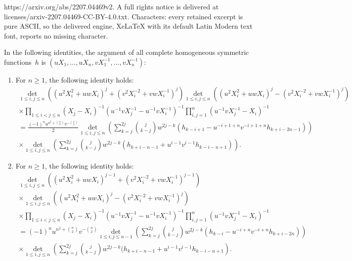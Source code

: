 \documentclass[10pt,a4paper]{amsart}
\begin{document}
https://arxiv.org/abs/2207.04469v2. A full rights notice is delivered at licenses/arxiv-2207.04469-CC-BY-4.0.txt. Characters: every retained excerpt is pure ASCII, so the delivered engine, XeLaTeX with its default Latin Modern text font, reports no missing character.
\begin{lemma} 
	\label{jacobitrudi3lem}
	In the following identities, the argument of all complete homogeneous symmetric functions~$h$ is $(u X_1,\ldots,u X_n,v X_1^{-1},\ldots,v X_n^{-1})$:
	\begin{enumerate}
		\item\label{lem:jacobitrudi3lem1} For $n \ge 1$, the following identity holds: 
		\begin{multline*} 
				\det\limits_{1 \le i,j \le n} \left( \left(u^2 X_i^2 + u w X_i\right)^j + \left(v^2 X_i^{-2} + v w X_i^{-1}\right)^j \right)
				\det\limits_{1 \le i,j \le n} \left( \left(u^2 X_i^2 + u w X_i\right)^j - \left(v^2 X_i^{-2} + v w X_i^{-1}\right)^j \right)\\
			\times \prod_{1 \le i < j \le n} (X_j-X_i)^{-1} (u^{-1} v X_j^{-1}-u^{-1}v X_i^{-1})^{-1} 
				\prod_{i,j=1}^{n}  (u^{-1} v X_j^{-1}-X_i)^{-1} \\
			= \frac{(-1)^n u^{n^2+\binom{n}{2}} v^{-\binom{n}{2}}}{2} 
			\det_{1 \le i, j \le n } \left( \sum_{k=j}^{2j} \binom{j}{k-j} w^{2j-k}  \left( h_{k-i+1} - u^{-i+1+n} v^{-i+1+n} h_{k+i-2n-1} \right) \right) 
			\\
			\times \det_{1 \le i,j \le n} \left(  \sum_{k=j}^{2j} \binom{j}{k-j} w^{2j-k} 
			(h_{k+i-n-1} + u^{i-1} v^{i-1} h_{k-i-n+1} )  \right).
		\end{multline*} 
		\item\label{lem:jacobitrudi3lem2} For $n \ge 1$, the following identity holds:
		\begin{multline*}
			\det\limits_{1 \le i,j \le n} \left( \left(u^2 X_i^2 + u w X_i\right)^{j-1} + \left(v^2 X_i^{-2} + v w X_i^{-1}\right)^{j-1} \right) \\
			\times\det\limits_{1 \le i,j \le n} \left( \left(u^2 X_i^2 + u w X_i\right)^j - \left(v^2 X_i^{-2} + v w X_i^{-1}\right)^j \right) \\
			\times\prod_{1 \le i < j \le n} (X_j-X_i)^{-1} (u^{-1} v X_j^{-1}-u^{-1}v X_i^{-1})^{-1} 
			\prod_{i,j=1}^{n}  (u^{-1} v X_j^{-1}-X_i)^{-1}\\
			= (-1)^n u^{n^2+\binom{n}{2}} v^{-\binom{n}{2}} 
			\det_{1 \le i, j \le n-1 } \left( \sum_{k=j}^{2j} \binom{j}{k-j} w^{2j-k}  \left( h_{k-i} - u^{-i+n} v^{-i+n} 
			h_{k+i-2n} \right) \right) 
			\\
			\times 
			\det_{1 \le i,j \le n} \left(  \sum_{k=j}^{2j} \binom{j}{k-j} w^{2j-k} 
			(h_{k+i-n-1}+ u^{i-1} v^{i-1}  h_{k-i-n+1} \right).
		\end{multline*}
	\end{enumerate} 
\end{lemma} 
\end{document}

